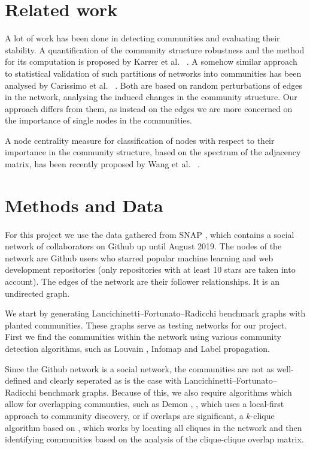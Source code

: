 \documentclass[9pt,twocolumn,twoside]{pnas-new}
\begin{document}
\section*{Related work}

A lot of work has been done in detecting communities and evaluating their stability. A quantification of the community structure robustness and the method for its computation is proposed by Karrer et al.~ \cite{karrer-levina}. A somehow similar approach to statistical validation of such partitions of networks into communities has been analysed by Carissimo et al.~ \cite{carissimo}. Both are based on random perturbations of edges in the network, analysing the induced changes in the community structure. Our approach differs from them, as instead on the edges we are more concerned on the importance of single nodes in the communities. 

A node centrality measure for classification of nodes with respect to their importance in the community structure, based on the spectrum of the adjacency matrix, has been recently proposed by Wang et al.~ \cite{wang-yang-fan}.


\section*{Methods and Data}

\paragraph{}For this project we use the data gathered from SNAP \cite{github_graph}, 
which contains a social network of collaborators on Github up until August 2019. 
The nodes of the network are Github users who starred popular machine learning and web development repositories 
(only repositories with at least 10 stars are taken into account).
The edges of the network are their follower relationships. It is an undirected graph.

We start by generating Lancichinetti–Fortunato–Radicchi benchmark graphs with planted communities.
These graphs serve as testing networks for our project.
First we find the communities within the network using various community detection algorithms, such as Louvain \cite{louvain}, Infomap \cite{infomap} and Label propagation. 

Since the Github network is a social network, the communities are not as well-defined and clearly seperated as is the case with Lancichinetti–Fortunato–Radicchi benchmark graphs.
Because of this, we also require algorithms which allow for overlapping communties, 
such as Demon \cite{Demon}, \cite{coscia-rossetti}, which uses a local-first approach to community discovery, or if overlaps are significant,
a $k$-clique algorithm based on \cite{palla-derenyi}, which works by locating all cliques in the network and then identifying communities based on the analysis of the clique-clique overlap matrix.
\end{document}
